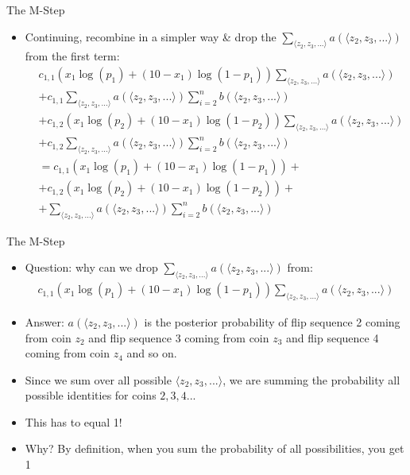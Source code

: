 \documentclass[aspectratio=169]{beamer}
\begin{document}
\begin{frame}{The M-Step}

	\begin{itemize}
	\item Continuing, recombine in a simpler way \& drop the  $\sum_{\langle z_2, z_3, ... \rangle} a(\langle z_2, z_3, ... \rangle)$ from the first term:
		\begin{align}
		&c_{1, 1} \left(x_1\log (p_1) + (10 - x_1) \log (1 - p_1) \right) \sum_{\langle z_2, z_3, ... \rangle} a(\langle z_2, z_3, ... \rangle) 
\nonumber \\
		&+ c_{1, 1} \sum_{\langle z_2, z_3, ... \rangle} a(\langle z_2, z_3, ... \rangle) \sum_{i = 2}^n b (\langle z_2, z_3, ... \rangle)  
\nonumber \\
		&+ c_{1, 2} \left(x_1\log (p_2) + (10 - x_1) \log (1 - p_2) \right) \sum_{\langle z_2, z_3, ... \rangle} a(\langle z_2, z_3, ... \rangle) 
\nonumber \\
		&+ c_{1, 2} \sum_{\langle z_2, z_3, ... \rangle} a(\langle z_2, z_3, ... \rangle) \sum_{i = 2}^n b (\langle z_2, z_3, ... \rangle)  
\nonumber \\
		&= c_{1, 1} \left(x_1\log (p_1) + (10 - x_1) \log (1 - p_1) \right) + \nonumber \\ 
		&+ c_{1, 2} \left(x_1\log (p_2) + (10 - x_1) \log (1 - p_2) \right) + \nonumber \\
		&+ \sum_{\langle z_2, z_3, ... \rangle} a(\langle z_2, z_3, ... \rangle) \sum_{i = 2}^n b (\langle z_2, z_3, ... \rangle) \nonumber
		\end{align}
	\end{itemize}
\end{frame}
\begin{frame}{The M-Step}

	\begin{itemize}
	\item Question: why can we drop $\sum_{\langle z_2, z_3, ... \rangle} a(\langle z_2, z_3, ... \rangle)$ from:
	\begin{align}
	c_{1, 1} \left(x_1\log (p_1) + (10 - x_1) \log (1 - p_1) \right) \sum_{\langle z_2, z_3, ... \rangle} a(\langle z_2, z_3, ... \rangle) \nonumber
	\end{align}
	\item Answer: $a(\langle z_2, z_3, ... \rangle)$ is the posterior probability of flip sequence 2 coming from coin $z_2$ and flip sequence 3 coming from coin $z_3$ and
	flip sequence 4 coming from coin $z_4$ and so on.
	\item Since we sum over all possible $\langle z_2, z_3, ... \rangle$, we are summing the probability all possible identities for coins $2, 3, 4...$
	\item This has to equal 1!  
	\item Why? By definition, when you sum the probability of all possibilities, you get 1
	\end{itemize}
	\end{frame}
\end{document}
